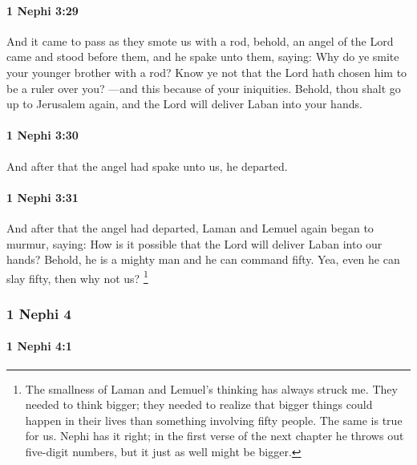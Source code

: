 		\paragraph{1 Nephi 3:29} %
			\label{1NEPHI-3-29}

			And it came to pass as they smote us with a rod,
			behold, an angel of the Lord came and stood before them,
			and he spake unto them, saying:
			Why do ye smite your younger brother with a rod?
			Know ye not that the Lord hath chosen him to be a ruler over you?
			---and this because of your iniquities.
			Behold, thou shalt go up to Jerusalem again,
			and the Lord will deliver Laban into your hands.

		\paragraph{1 Nephi 3:30} %
			\label{1NEPHI-3-30}

			And after that the angel had spake unto us, he departed.

		\paragraph{1 Nephi 3:31} %
			\label{1NEPHI-3-31}

			And after that the angel had departed,
			Laman and Lemuel again began to murmur, saying:
			How is it possible that the Lord will deliver Laban into our hands?
			Behold, he is a mighty man and he can command fifty.
			Yea, even he can slay fifty, then why not us?%
				\footnote{%
					\label{1NEPHI-3-31-NOTE-fifty}%
					The smallness of Laman and Lemuel's thinking has always struck me. They needed to think bigger; they needed to realize that bigger things could happen in their lives than something involving fifty people. The same is true for us. Nephi has it right; in the first verse of the next chapter he throws out five-digit numbers, but it just as well might be bigger.
					}
					
	\subsubsection{1 Nephi 4} %
		\label{1NEPHI-4}
		
		\paragraph{1 Nephi 4:1} %
			\label{1NEPHI-4-1}

